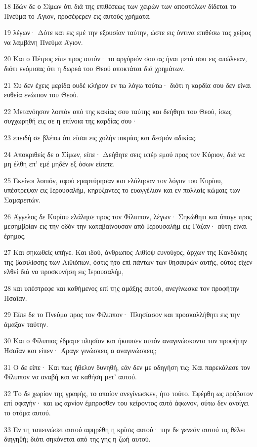 \par 18 Ιδών δε ο Σίμων ότι διά της επιθέσεως των χειρών των αποστόλων δίδεται το Πνεύμα το Άγιον, προσέφερεν εις αυτούς χρήματα,
\par 19 λέγων· Δότε και εις εμέ την εξουσίαν ταύτην, ώστε εις όντινα επιθέσω τας χείρας να λαμβάνη Πνεύμα Άγιον.
\par 20 Και ο Πέτρος είπε προς αυτόν· το αργύριόν σου ας ήναι μετά σου εις απώλειαν, διότι ενόμισας ότι η δωρεά του Θεού αποκτάται διά χρημάτων.
\par 21 Συ δεν έχεις μερίδα ουδέ κλήρον εν τω λόγω τούτω· διότι η καρδία σου δεν είναι ευθεία ενώπιον του Θεού.
\par 22 Μετανόησον λοιπόν από της κακίας σου ταύτης και δεήθητι του Θεού, ίσως συγχωρηθή εις σε η επίνοια της καρδίας σου·
\par 23 επειδή σε βλέπω ότι είσαι εις χολήν πικρίας και δεσμόν αδικίας.
\par 24 Αποκριθείς δε ο Σίμων, είπε· Δεήθητε σεις υπέρ εμού προς τον Κύριον, διά να μη έλθη επ' εμέ μηδέν εξ όσων είπετε.
\par 25 Εκείνοι λοιπόν, αφού εμαρτύρησαν και ελάλησαν τον λόγον του Κυρίου, υπέστρεψαν εις Ιερουσαλήμ, κηρύξαντες το ευαγγέλιον και εν πολλαίς κώμαις των Σαμαρειτών.
\par 26 Άγγελος δε Κυρίου ελάλησε προς τον Φίλιππον, λέγων· Σηκώθητι και ύπαγε προς μεσημβρίαν εις την οδόν την καταβαίνουσαν από Ιερουσαλήμ εις Γάζαν· αύτη είναι έρημος.
\par 27 Και σηκωθείς υπήγε. Και ιδού, άνθρωπος Αιθίοψ ευνούχος, άρχων της Κανδάκης της βασιλίσσης των Αιθιόπων, όστις ήτο επί πάντων των θησαυρών αυτής, ούτος είχεν ελθεί διά να προσκυνήση εις Ιερουσαλήμ,
\par 28 και υπέστρεφε και καθήμενος επί της αμάξης αυτού, ανεγίνωσκε τον προφήτην Ησαΐαν.
\par 29 Είπε δε το Πνεύμα προς τον Φίλιππον· Πλησίασον και προσκολλήθητι εις την άμαξαν ταύτην.
\par 30 Και ο Φίλιππος έδραμε πλησίον και ήκουσεν αυτόν αναγινώσκοντα τον προφήτην Ησαΐαν και είπεν· Άραγε γινώσκεις α αναγινώσκεις;
\par 31 Ο δε είπε· Και πως ήθελον δυνηθή, εάν δεν με οδηγήση τις; Και παρεκάλεσε τον Φίλιππον να αναβή και να καθήση μετ' αυτού.
\par 32 Το δε χωρίον της γραφής, το οποίον ανεγίνωσκεν, ήτο τούτο. Εφέρθη ως πρόβατον επί σφαγήν· και ως αρνίον έμπροσθεν του κείροντος αυτό άφωνον, ούτω δεν ανοίγει το στόμα αυτού.
\par 33 Εν τη ταπεινώσει αυτού αφηρέθη η κρίσις αυτού· την δε γενεάν αυτού τις θέλει διηγηθή; διότι σηκόνεται από της γης η ζωή αυτού.
